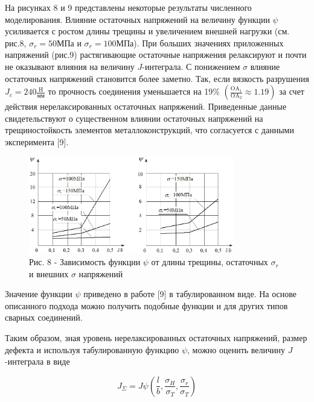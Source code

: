 \begin{multicols}{2}
На рисунках 8 и 9 представлены некоторые результаты численного
моделирования. Влияние остаточных напряжений на величину функции
$\psi$ усиливается с ростом длины трещины
и увеличением внешней нагрузки (см. рис.8,
$\sigma_{r}=50$МПа и
$\sigma_{r}=100$МПа). При больших значениях
приложенных напряжений (рис.9) растягивающие остаточные напряжения
релаксируют и почти не оказывают влияния на величину
$J$-интеграла. С понижением
$\sigma$ влияние остаточных напряжений
становится более заметно. Так, если вязкость разрушения
$J_{c} = 240 \frac{\text{H}}{\text{мм}}$ то прочность соединения
уменьшается на 19\% $\left( \frac{\text{OA}_{1}}{\text{OA}_{2}} \approx 1.19 \right)$ за счет
действия нерелаксированных остаточных напряжений. Приведенные данные
свидетельствуют о существенном влиянии остаточных напряжений на
трещиностойкость элементов металлоконструкций, что согласуется с данными
эксперимента {[}9{]}.
\end{multicols}

\begin{figure}[H]
	\centering
	\includegraphics[width=0.8\textwidth]{assets/1237}
	\caption*{Рис. 8 - Зависимость функции $\psi$ от длины трещины, остаточных $\sigma_{r}$ и внешних $\sigma$ напряжений}
\end{figure}

\begin{multicols}{2}
Значение функции $\psi$ приведено в работе
{[}9{]} в табулированном виде. На основе описанного подхода можно
получить подобные функции и для других типов сварных соединений.

Таким образом, зная уровень нерелаксированных остаточных напряжений,
размер дефекта и используя табулированную функцию
$\psi$, можно оценить величину
$J$-интеграла в виде

\begin{equation}
J_{\Sigma} = J \psi \left( \frac{l}{b}, \frac{\sigma_{H}}{\sigma_{T}}, \frac{\sigma_{r}}{\sigma_{T}} \right)
\end{equation}
\end{multicols}

